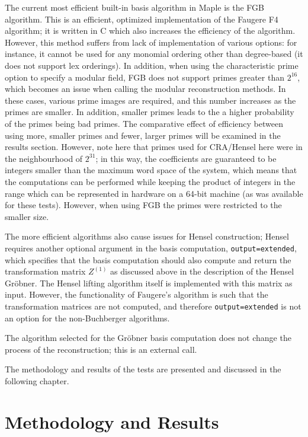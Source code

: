\documentclass[letterpaper,12pt,titlepage,oneside,final]{book}
\begin{document}
The current most efficient built-in basis algorithm in Maple is the FGB algorithm.  This is an efficient, optimized implementation of the Faugere F4 algorithm; it is written in C which also increases the efficiency of the algorithm.  However, this method suffers from lack of implementation of various options: for instance, it cannot be used for any monomial ordering other than degree-based (it does not support lex orderings).  In addition, when using the characteristic prime option to specify a modular field, FGB does not support primes greater than ${2^{16}}$, which becomes an issue when calling the modular reconstruction methods.  In these cases, various prime images are required, and this number increases as the primes are smaller.  In addition, smaller primes leads to the a higher probability of the primes being bad primes.  The comparative effect of efficiency between using more, smaller primes and fewer, larger primes will be examined in the results section.  However, note here that primes used for CRA/Hensel here were in the neighbourhood of ${2^{31}}$; in this way, the coefficients are guaranteed to be integers smaller than the maximum word space of the system, which means that the computations can be performed while keeping the product of integers in the range which can be represented in hardware on a 64-bit machine (as was available for these tests).  However, when using FGB the primes were restricted to the smaller size.

The more efficient algorithms also cause issues for Hensel construction; Hensel requires another optional argument in the basis computation, \texttt{output=extended}, which specifies that the basis computation should also compute and return the transformation matrix ${Z^{(1)}}$ as discussed above in the description of the Hensel Gr\"obner.  The Hensel lifting algorithm itself is implemented with this matrix as input.  However, the functionality of Faugere's algorithm is such that the transformation matrices are not computed, and therefore \texttt{output=extended} is not an option for the non-Buchberger algorithms.  

The algorithm selected for the Gr\"obner basis computation does not change the process of the reconstruction; this is an external call.



The methodology and results of the tests are presented and discussed in the following chapter.

\chapter{Methodology and Results}
\end{document}
